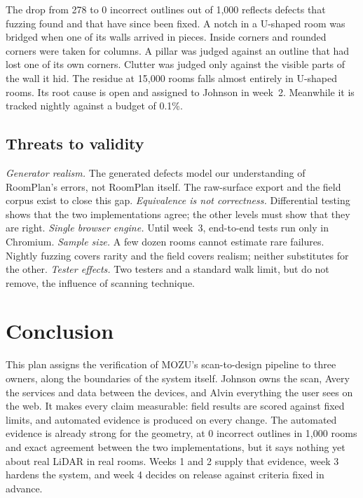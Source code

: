 \documentclass[conference,a4paper,10pt]{IEEEtran}
\begin{document}
The drop from 278 to 0 incorrect outlines out of 1{,}000 reflects defects
that fuzzing found and that have since been fixed. A notch in a U-shaped room
was bridged when one of its walls arrived in pieces. Inside corners and
rounded corners were taken for columns. A pillar was judged against an
outline that had lost one of its own corners. Clutter was judged only against
the visible parts of the wall it hid. The residue at 15{,}000 rooms falls
almost entirely in U-shaped rooms. Its root cause is open and assigned to
Johnson in week~2. Meanwhile it is tracked nightly against a budget of 0.1\%.

\subsection{Threats to validity}

\emph{Generator realism.} The generated defects model our understanding of
RoomPlan's errors, not RoomPlan itself. The raw-surface export and the field
corpus exist to close this gap.
\emph{Equivalence is not correctness.} Differential testing shows that the
two implementations agree; the other levels must show that they are right.
\emph{Single browser engine.} Until week~3, end-to-end tests run only in
Chromium.
\emph{Sample size.} A few dozen rooms cannot estimate rare failures. Nightly
fuzzing covers rarity and the field covers realism; neither substitutes for
the other.
\emph{Tester effects.} Two testers and a standard walk limit, but do not
remove, the influence of scanning technique.

\section{Conclusion}\label{sec:conclusion}

This plan assigns the verification of MOZU's scan-to-design pipeline to three
owners, along the boundaries of the system itself. Johnson owns the scan,
Avery the services and data between the devices, and Alvin everything the
user sees on the web. It makes every claim measurable: field results are
scored against fixed limits, and automated evidence is produced on every
change. The automated evidence is already strong for the geometry, at 0
incorrect outlines in 1{,}000 rooms and exact agreement between the two
implementations, but it says nothing yet about real LiDAR in real rooms.
Weeks 1 and 2 supply that evidence, week 3 hardens the system, and week 4
decides on release against criteria fixed in advance.
\end{document}
